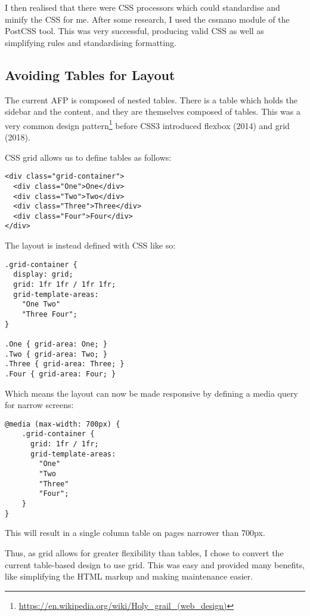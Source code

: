 \documentclass[bsc,frontabs,oneside,singlespacing,parskip,deptreport,logo]{infthesis}
\begin{document}
I then realised that there were CSS processors which could standardise and minify the CSS for me. After some research, I used the cssnano module of the PostCSS tool. This was very successful, producing valid CSS as well as simplifying rules and standardising formatting.

\subsection{Avoiding Tables for Layout} \label{sec:table-layout}

The current AFP is composed of nested tables. There is a table which holds the sidebar and the content, and they are themselves composed of tables. This was a very common design pattern\footnote{\url{https://en.wikipedia.org/wiki/Holy\_grail\_(web\_design)}} before CSS3 introduced flexbox (2014) and grid (2018).

CSS grid allows us to define tables as follows:

{\footnotesize
\begin{verbatim}
<div class="grid-container">
  <div class="One">One</div>
  <div class="Two">Two</div>
  <div class="Three">Three</div>
  <div class="Four">Four</div>
</div>
\end{verbatim}
}

The layout is instead defined with CSS like so:

{\footnotesize
\begin{verbatim}
.grid-container {
  display: grid;
  grid: 1fr 1fr / 1fr 1fr;
  grid-template-areas:
    "One Two"
    "Three Four";
}

.One { grid-area: One; }
.Two { grid-area: Two; }
.Three { grid-area: Three; }
.Four { grid-area: Four; }
\end{verbatim}
}

Which means the layout can now be made responsive by defining a media query for narrow screens:

{\footnotesize
\begin{verbatim}
@media (max-width: 700px) {
    .grid-container {
      grid: 1fr / 1fr;
      grid-template-areas:
        "One"
        "Two
        "Three" 
        "Four";
    }
}
\end{verbatim}
}

This will result in a single column table on pages narrower than 700px.

Thus, as grid allows for greater flexibility than tables, I chose to convert the current table-based design to use grid. This was easy and provided many benefits, like simplifying the HTML markup and making maintenance easier.
\end{document}
